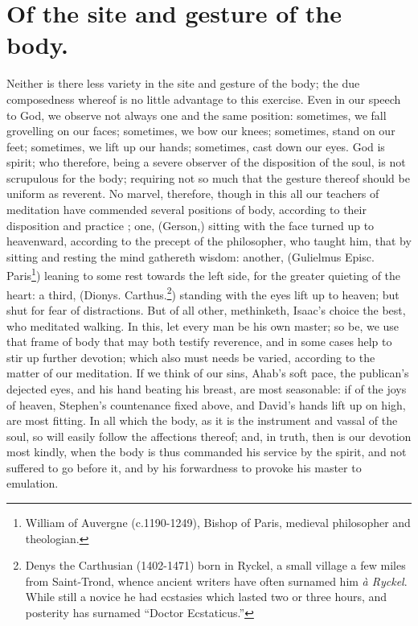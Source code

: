\section{Of the site and gesture of the body.}
Neither is there less variety in the site and gesture of the body; the due composedness whereof is no little advantage to this exercise. Even in our speech to God, we observe not always one and the same position: sometimes, we fall grovelling on our faces; sometimes, we bow our knees; sometimes, stand on our feet; sometimes, we lift up our hands; sometimes, cast down our eyes. God is spirit; who therefore, being a severe observer of the disposition of the soul, is not scrupulous for the body; requiring not so much that the gesture thereof should be uniform as reverent. No marvel, therefore, though in this all our teachers of meditation have commended several positions of body, according to their disposition and practice ; one, (Gerson,) sitting with the face turned up to heavenward, according to the precept of the philosopher, who taught him, that by sitting and resting the mind gathereth wisdom: another, (Gulielmus Episc. Paris\footnote{William of Auvergne (c.1190-1249), Bishop of Paris, medieval philosopher and theologian.}) leaning to some rest towards the left side, for the greater quieting of the heart: a third, (Dionys. Carthus.\footnote{Denys the Carthusian (1402-1471) born in Ryckel, a small village a few miles from Saint-Trond, whence ancient writers have often surnamed him \emph{à Ryckel}. While still a novice he had ecstasies which lasted two or three hours, and posterity has surnamed ``Doctor Ecstaticus.''\cite{cath1913}}) standing with the eyes lift up to heaven; but shut for fear of distractions. But of all other, methinketh, Isaac's choice the best, who meditated walking. In this, let every man be his own master; so be, we use that frame of body that may both testify reverence, and in some cases help to stir up further devotion; which also must needs be varied, according to the matter of our meditation. If we think of our sins, Ahab's soft pace, the publican's dejected eyes, and his hand beating his breast, are most seasonable: if of the joys of heaven, Stephen's countenance fixed above, and David's hands lift up on high, are most fitting. In all which the body, as it is the instrument and vassal of the soul, so will easily follow the affections thereof; and, in truth, then is our devotion most kindly, when the body is thus commanded his service by the spirit, and not suffered to go before it, and by his forwardness to provoke his master to emulation. 
